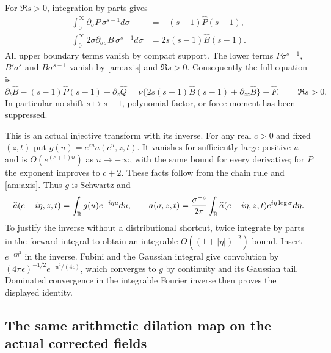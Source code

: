 For $\Re s>0$, integration by parts gives
\begin{align*}
 \int_0^\infty\partial_\sigma P\,\sigma^{s-1}d\sigma
    &=-(s-1)\widehat P(s-1),\\
 \int_0^\infty 2\sigma\partial_{\sigma\sigma}B\,
                       \sigma^{s-1}d\sigma
    &=2s(s-1)\widehat B(s-1).
\end{align*}
All upper boundary terms vanish by compact support. The lower terms
$P\sigma^{s-1}$, $B'\sigma^s$ and $B\sigma^{s-1}$ vanish by
\eqref{am:axis} and $\Re s>0$. Consequently the full equation is
\begin{equation}
 \partial_t\widehat B-(s-1)\widehat P(s-1)+\partial_z\widehat Q
 =\nu\{2s(s-1)\widehat B(s-1)+\partial_{zz}\widehat B\}
       +\widehat F,\qquad\Re s>0.
 \label{am:mellin}
\end{equation}
In particular no shift $s\mapsto s-1$, polynomial factor, or force
moment has been suppressed.

This is an actual injective transform with its inverse. For any real
$c>0$ and fixed $(z,t)$ put $g(u)=e^{cu}a(e^u,z,t)$.
It vanishes for sufficiently large positive $u$ and is
$O(e^{(c+1)u})$ as $u\to-\infty$, with the same bound for every
derivative; for $P$ the exponent improves to $c+2$.
These facts follow from the chain rule and \eqref{am:axis}.
Thus $g$ is Schwartz and
\[
 \widehat a(c-i\eta,z,t)=\int_\mathbb R g(u)e^{-i\eta u}du,
 \qquad
 a(\sigma,z,t)=\frac{\sigma^{-c}}{2\pi}\int_\mathbb R
          \widehat a(c-i\eta,z,t)e^{i\eta\log\sigma}d\eta.
\]
To justify the inverse without a distributional shortcut, twice
integrate by parts in the forward integral to obtain an integrable
$O((1+|\eta|)^{-2})$ bound. Insert $e^{-\epsilon\eta^2}$ in the
inverse. Fubini and the Gaussian integral give convolution by
$(4\pi\epsilon)^{-1/2}e^{-u^2/(4\epsilon)}$, which converges to
$g$ by continuity and its Gaussian tail. Dominated convergence in
the integrable Fourier inverse then proves the displayed identity.

\subsection*{The same arithmetic dilation map on the actual corrected fields}

